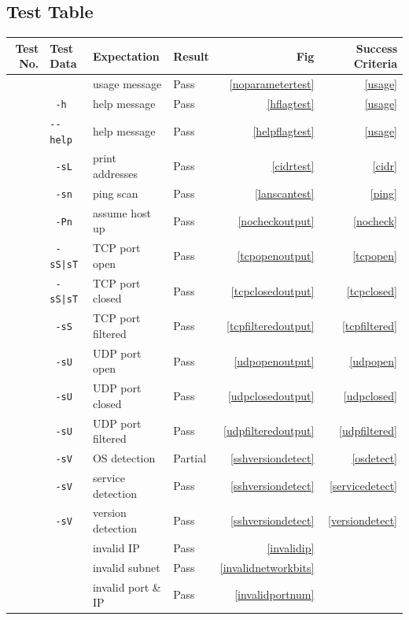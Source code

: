 \documentclass[titlepage]{article}
\let\Oldsubsection\subsection{}
\renewcommand{\subsection}{\FloatBarrier\Oldsubsection}
\begin{document}
\subsection{Test Table}
\newcommand\rownumber{\stepcounter{row number}\arabic{row number}}
\begin{center}
  \begin{tabular}{r l l l r r}
    \toprule
    Test No. & Test Data & Expectation & Result & Fig & Success Criteria \\
    \midrule
    \rownumber{} & & usage message & Pass &\ref{noparametertest} &\ref{usage}  \\
    \rownumber{} & \verb| -h| & help message & Pass &\ref{hflagtest} &\ref{usage}  \\
    \rownumber{} & \verb|--help| & help message & Pass &\ref{helpflagtest} &\ref{usage}  \\
    \rownumber{} & \verb| -sL| & print addresses & Pass &\ref{cidrtest} &\ref{cidr}  \\
    \rownumber{} & \verb| -sn| & ping scan & Pass &\ref{lanscantest} &\ref{ping}  \\
    \rownumber{} & \verb| -Pn| & assume host up& Pass &\ref{nocheckoutput} &\ref{nocheck}  \\
    \rownumber{} & \verb$ -sS|sT$ & TCP port open& Pass &\ref{tcpopenoutput} &\ref{tcpopen}  \\
    \rownumber{} & \verb$ -sS|sT$ & TCP port closed& Pass &\ref{tcpclosedoutput} &\ref{tcpclosed}  \\
    \rownumber{} & \verb| -sS| & TCP port filtered& Pass &\ref{tcpfilteredoutput} &\ref{tcpfiltered}  \\
    \rownumber{} & \verb| -sU| & UDP port open& Pass &\ref{udpopenoutput} &\ref{udpopen}  \\
    \rownumber{} & \verb| -sU| & UDP port closed& Pass &\ref{udpclosedoutput} &\ref{udpclosed}  \\
    \rownumber{} & \verb| -sU| & UDP port filtered& Pass &\ref{udpfilteredoutput} &\ref{udpfiltered}  \\
    \rownumber{} & \verb| -sV| & OS detection & Partial &\ref{sshversiondetect} &\ref{osdetect}  \\
    \rownumber{} & \verb| -sV| & service detection & Pass &\ref{sshversiondetect} &\ref{servicedetect}  \\
    \rownumber{} & \verb| -sV| & version detection & Pass &\ref{sshversiondetect} &\ref{versiondetect}  \\
    \rownumber{} & & invalid IP & Pass &\ref{invalidip} & \\
    \rownumber{} & & invalid subnet & Pass &\ref{invalidnetworkbits} & \\
    \rownumber{} & & invalid port \& IP & Pass &\ref{invalidportnum} & \\
    \bottomrule
  \end{tabular}
\end{center}
\end{document}
